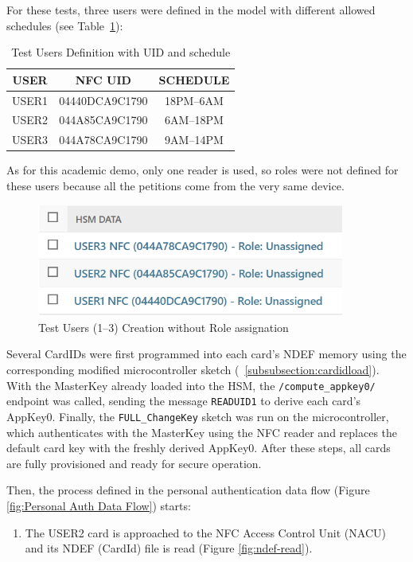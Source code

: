 For these tests, three users were defined in the model with different allowed schedules (see Table~\ref{tab:test-users}):

\begin{table}[H]
	\centering
	\begin{tabular}{|c|c|c|}
		\hline
		\textbf{USER} & \textbf{NFC UID} & \textbf{SCHEDULE} \\
		\hline
		USER1 & 04440DCA9C1790 & 18PM--6AM \\
		\hline
		USER2 & 044A85CA9C1790 & 6AM--18PM \\
		\hline
		USER3 & 044A78CA9C1790 & 9AM--14PM \\
		\hline
	\end{tabular}
	\caption{Test Users Definition with UID and schedule}
	\label{tab:test-users}
\end{table}

As for this academic demo, only one reader is used, so roles were not defined for these users because all the petitions come from the very same device.

\begin{figure}[H]
	\centering
	\includegraphics[width=0.9\textwidth]{imaxes/Tests_Users.png}
	\caption{Test Users (1--3) Creation without Role assignation}
	\label{fig:test-users}
\end{figure}

Several CardIDs were first programmed into each card’s NDEF memory using the corresponding modified microcontroller sketch (~\ref{subsubsection:cardidload}). With the MasterKey already loaded into the HSM, the \texttt{/compute\_appkey0/} endpoint was called, sending the message \texttt{READUID1} to derive each card’s AppKey0. Finally, the \texttt{FULL\_ChangeKey} sketch was run on the microcontroller, which authenticates with the MasterKey using the NFC reader and replaces the default card key with the freshly derived AppKey0. After these steps, all cards are fully provisioned and ready for secure operation.

Then, the process defined in the personal authentication data flow (Figure \ref{fig:Personal Auth Data Flow}) starts:
\begin{enumerate}
	\item The USER2 card is approached to the NFC Access Control Unit (NACU) and its NDEF (CardId) file is read (Figure \ref{fig:ndef-read}).
\end{enumerate}

